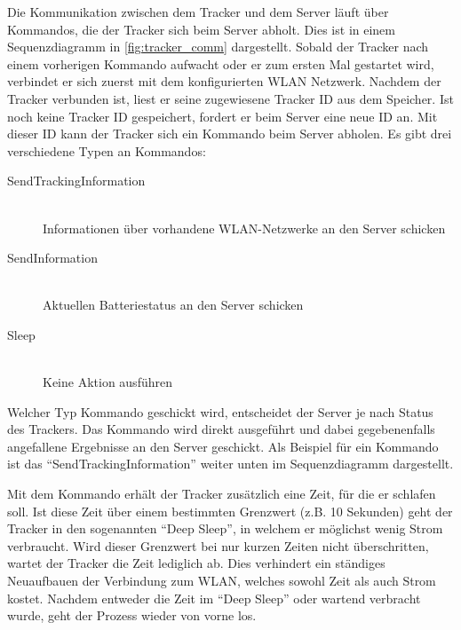 Die Kommunikation zwischen dem Tracker und dem Server läuft über Kommandos, die der Tracker sich beim Server abholt.
Dies ist in einem Sequenzdiagramm in \autoref{fig:tracker_comm} dargestellt.
Sobald der Tracker nach einem vorherigen Kommando aufwacht oder er zum ersten Mal gestartet wird, verbindet er sich zuerst
mit dem konfigurierten \gls{WLAN} Netzwerk.
Nachdem der Tracker verbunden ist, liest er seine zugewiesene Tracker ID aus dem Speicher.
Ist noch keine Tracker ID gespeichert, fordert er beim Server eine neue ID an.
Mit dieser ID kann der Tracker sich ein Kommando beim Server abholen.
Es gibt drei verschiedene Typen an Kommandos:
\begin{description}
	\item[SendTrackingInformation] \hfill \\
		Informationen über vorhandene \gls{WLAN}-Netzwerke an den Server schicken
	\item[SendInformation] \hfill \\
		Aktuellen Batteriestatus an den Server schicken
	\item[Sleep] \hfill \\
		Keine Aktion ausführen
\end{description}
Welcher Typ Kommando geschickt wird, entscheidet der Server je nach Status des Trackers.
Das Kommando wird direkt ausgeführt und dabei gegebenenfalls angefallene Ergebnisse an den Server geschickt.
Als Beispiel für ein Kommando ist das \enquote{SendTrackingInformation} weiter unten im Sequenzdiagramm dargestellt.

Mit dem Kommando erhält der Tracker zusätzlich eine Zeit, für die er schlafen soll.
Ist diese Zeit über einem bestimmten Grenzwert (z.B. 10 Sekunden) geht der Tracker in den sogenannten \enquote{Deep Sleep},
in welchem er möglichst wenig Strom verbraucht.
Wird dieser Grenzwert bei nur kurzen Zeiten nicht überschritten, wartet der Tracker die Zeit lediglich ab.
Dies verhindert ein ständiges Neuaufbauen der Verbindung zum \gls{WLAN}, welches sowohl Zeit als auch Strom kostet.
Nachdem entweder die Zeit im \enquote{Deep Sleep} oder wartend verbracht wurde, geht der Prozess wieder von vorne los.

